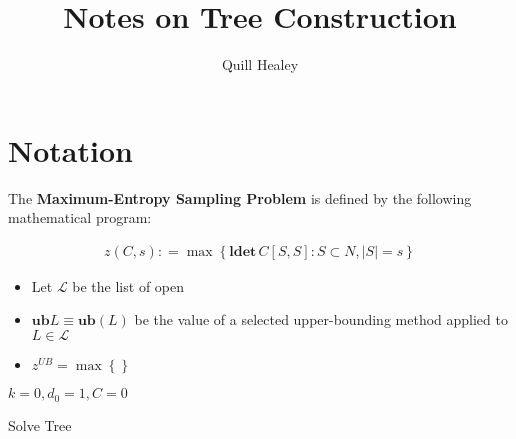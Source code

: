 \documentclass[12pt, reqno]{article}
\title{Notes on Tree Construction}
\author{Quill Healey}
\newcommand{\definedas}{\mathrel{\mathop:}=}
\begin{document}
\maketitle

\section*{Notation}
\noindent The \textbf{Maximum-Entropy Sampling Problem} is defined by the following mathematical program:

\begin{align*}
    z(C, s) \definedas \max \left\{ \textbf{ldet}\, C[S, S] : S \subset N, \left| S \right| = s\right\} 
\end{align*}

\begin{itemize}
    \item Let $\mathcal{L}$ be the list of open
    \item $\textbf{ub} L \equiv \textbf{ub}(L)$ be the value of a selected upper-bounding method applied to $L \in \mathcal{L}$
    \item $z^{UB} = \max \left\{  \right\}$
\end{itemize}

\begin{algorithm}[H]
    \SetAlgoLined
        $k=0, d_0 = 1, C = 0$\;
        \caption{Solve Tree}
\end{algorithm}    
\end{document}
